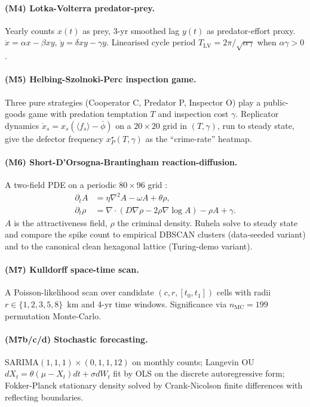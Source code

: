 \documentclass[11pt,a4paper]{article}
\newcommand{\1}{\mathbf{1}}
\theoremstyle{plain}
\theoremstyle{definition}
\begin{document}
\paragraph{(M4) Lotka-Volterra predator-prey.}
Yearly counts $x(t)$ as prey, 3-yr smoothed lag $y(t)$ as
predator-effort proxy.
$\dot x = \alpha x - \beta xy$,
$\dot y = \delta xy - \gamma y$.
Linearised cycle period $T_{\mathrm{LV}} = 2\pi/\sqrt{\alpha\gamma}$
when $\alpha\gamma>0$.

\paragraph{(M5) Helbing-Szolnoki-Perc inspection game.}  Three pure
strategies (Cooperator C, Predator P, Inspector O) play a
public-goods game with predation temptation $T$ and inspection cost
$\gamma$.  Replicator dynamics
$\dot x_s = x_s(\langle f_s\rangle - \bar\phi)$ on a $20\times 20$
grid in $(T,\gamma)$, run to steady state, give the defector
frequency $x_P^\star(T,\gamma)$ as the ``crime-rate'' heatmap.

\paragraph{(M6) Short-D'Orsogna-Brantingham reaction-diffusion.}
A two-field PDE on a periodic $80\times 96$ grid
\cite{short2008pde}:
\begin{align}
  \partial_t A &= \eta\nabla^2 A - \omega A + \theta\rho,\\
  \partial_t \rho &= \nabla\cdot(D\nabla\rho - 2\rho\nabla\log A)
                     - \rho A + \gamma.
\end{align}
$A$ is the attractiveness field, $\rho$ the criminal density.
Ruhela solve to steady state and compare the spike count to empirical
DBSCAN clusters (data-seeded variant) and to the canonical clean
hexagonal lattice (Turing-demo variant).

\paragraph{(M7) Kulldorff space-time scan.}
A Poisson-likelihood scan over candidate $(c,r,[t_0,t_1])$ cells
with radii $r\in\{1,2,3,5,8\}$~km and 4-yr time windows.
Significance via $n_{\mathrm{MC}} = 199$ permutation Monte-Carlo.

\paragraph{(M7b/c/d) Stochastic forecasting.}
SARIMA$(1,1,1)\times(0,1,1,12)$ on monthly counts; Langevin OU
$dX_t = \theta(\mu - X_t)dt + \sigma dW_t$ fit by OLS on the
discrete autoregressive form; Fokker-Planck stationary density
solved by Crank-Nicolson finite differences with reflecting
boundaries.
\end{document}
